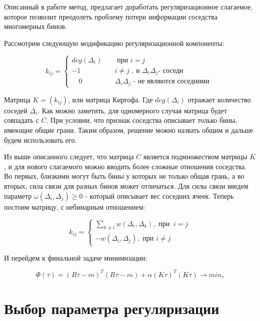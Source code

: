 \documentclass[a4paper,12pt]{diplom}
\renewcommand{\geq}{\geqslant}
\begin{document}
Описанный в работе \cite{SvdBogomolov} метод, предлагает доработать регуляризационное слагаемое, которое позволит преодолеть проблему потери информации 
соседства многомерных бинов.

Рассмотрим следующую модификацию регуляризационной компоненты:

\begin{equation}
 k_{ij} =
  \begin{cases}
    deg(\Delta_{i}) & \quad \text{ при } i = j \\
     -1              & \quad i \neq j  \text{ , и } \Delta_{i} \Delta_{j} \text{- соседи } \\
\quad 0               & \quad \Delta_{i} \Delta_{j} \text{ - не являются соседними }
  \end{cases}
\end{equation}

Матрица $K = (k_{ij})$, или матрица Киргофа. Где $deg(\Delta_{i})$ отражает количество соседей $\Delta_{i}$. 
Как можно заметить, для одномерного случая матрица будет совпадать 
с $C$. При условии, что признак соседства описывает только бины, имеющие общие грани. 
Таким образом, решение можно назвать общим и дальше будем использовать его.

Из выше описанного следует, что матрица $C$ является подмножеством матрицы $K$, и для нового слагаемого можно вводить более сложные
отношения соседства. Во первых, близкими могут быть бины у которых не только общая грань, а во вторых, сила связи для разных бинов
может отличаться. Для силы связи введем параметр $\omega(\Delta_{i}, \Delta_{j}) \geq 0$ - который описывает вес соседних ячеек. 
Теперь постоим матрицу, с небинарным отношением:

\begin{equation}
 k_{ij} =
  \begin{cases}
    \displaystyle\sum_{k\neq i} w(\Delta_{i}, \Delta_{k}), \text{ при } \ i = j \\
    -w( \Delta_{i}, \Delta_{j} ), \text{ при } i \neq j
  \end{cases}
\end{equation}

И перейдем к финальной задаче минимизации:

\begin{equation}
   \Phi(\tau)=(R\tau-m)^T (R\tau-m) + \alpha(K\tau)^T(K\tau) \to min_{\tau}
   \label{min_n_dim}
\end{equation}
  

\section{Выбор параметра регуляризации}
\end{document}
